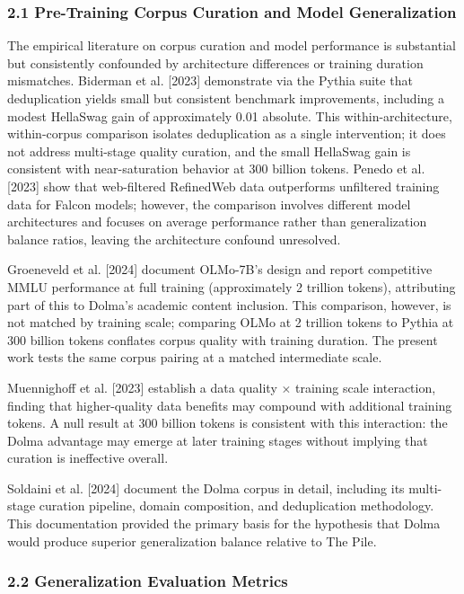
\subsubsection{2.1 Pre-Training Corpus Curation and Model Generalization}

The empirical literature on corpus curation and model performance is substantial but consistently confounded by architecture differences or training duration mismatches. Biderman et al. [2023] demonstrate via the Pythia suite that deduplication yields small but consistent benchmark improvements, including a modest HellaSwag gain of approximately 0.01 absolute. This within-architecture, within-corpus comparison isolates deduplication as a single intervention; it does not address multi-stage quality curation, and the small HellaSwag gain is consistent with near-saturation behavior at 300 billion tokens. Penedo et al. [2023] show that web-filtered RefinedWeb data outperforms unfiltered training data for Falcon models; however, the comparison involves different model architectures and focuses on average performance rather than generalization balance ratios, leaving the architecture confound unresolved.

Groeneveld et al. [2024] document OLMo-7B's design and report competitive MMLU performance at full training (approximately 2 trillion tokens), attributing part of this to Dolma's academic content inclusion. This comparison, however, is not matched by training scale; comparing OLMo at 2 trillion tokens to Pythia at 300 billion tokens conflates corpus quality with training duration. The present work tests the same corpus pairing at a matched intermediate scale.

Muennighoff et al. [2023] establish a data quality $\times$ training scale interaction, finding that higher-quality data benefits may compound with additional training tokens. A null result at 300 billion tokens is consistent with this interaction: the Dolma advantage may emerge at later training stages without implying that curation is ineffective overall.

Soldaini et al. [2024] document the Dolma corpus in detail, including its multi-stage curation pipeline, domain composition, and deduplication methodology. This documentation provided the primary basis for the hypothesis that Dolma would produce superior generalization balance relative to The Pile.

\subsubsection{2.2 Generalization Evaluation Metrics}

